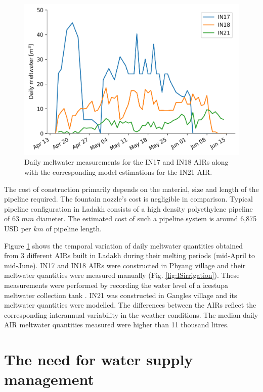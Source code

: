 \begin{figure}[htb]
\centering
\includegraphics[width=\textwidth]{figs/melt.png}
\caption{Daily meltwater measurements for the IN17 and IN18 AIRs along with the corresponding model estimations
for the IN21 AIR. }
\label{fig:ISmelt}
\end{figure}

The cost of construction primarily depends on the material, size and length of the pipeline required. The
fountain nozzle's cost is negligible in comparison. Typical pipeline configuration in Ladakh consists of a high
density polyethylene pipeline of 63 $mm$ diameter. The estimated cost of such a pipeline system is around 6,875
USD per $km$ of pipeline length.

Figure \ref{fig:ISmelt} shows the temporal variation of daily meltwater quantities obtained from 3 different
AIRs built in Ladakh during their melting periods (mid-April to mid-June). IN17 and IN18 AIRs were constructed
in Phyang village and their meltwater quantities were measured manually (Fig. \ref{fig:ISirrigation}). These
measurements were performed by recording the water level of a icestupa meltwater collection tank
\citep{simantvermaIceStupaMeltwater2018}. IN21 was constructed in Gangles village and its meltwater quantities
were modelled. The differences between the AIRs reflect the corresponding interannual variability in the weather
conditions. The median daily AIR meltwater quantities measured were higher than 11 thousand litres. 

\section{The need for water supply management}

